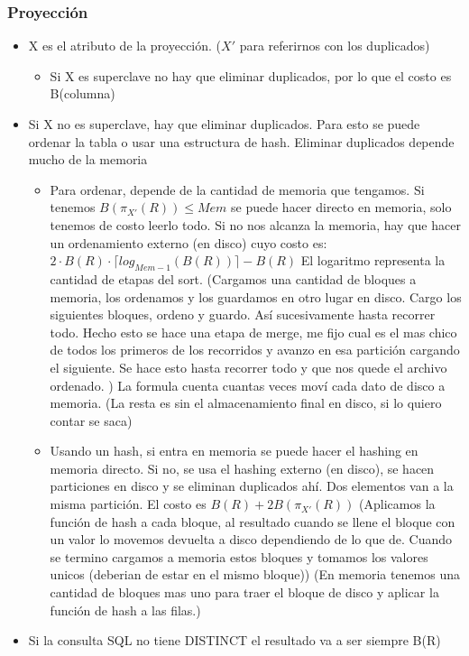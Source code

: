 \subsubsection*{Proyección}

\begin{itemize}
\item X es el atributo de la proyección. ($X'$ para referirnos con los duplicados)
    \begin{itemize}
    \item Si X es superclave no hay que eliminar duplicados, por lo que el costo es B(columna)
    \end{itemize}
\item Si X no es superclave, hay que eliminar duplicados. Para esto se puede ordenar la tabla o usar una estructura de hash. Eliminar duplicados depende mucho de la memoria
    \begin{itemize}
    \item Para ordenar, depende de la cantidad de memoria que tengamos. Si tenemos $B(\pi_{X'}(R)) \leq Mem$ se puede hacer directo en memoria, solo tenemos de costo leerlo todo. Si no nos alcanza la memoria, hay que hacer un ordenamiento externo (en disco) cuyo costo es: $ 2 \cdot B(R) \cdot \lceil log_{Mem-1}(B(R)) \rceil - B(R) $ El logaritmo representa la cantidad de etapas del sort. (Cargamos una cantidad de bloques a memoria, los ordenamos y los guardamos en otro lugar en disco. Cargo los siguientes bloques, ordeno y guardo. Así sucesivamente hasta recorrer todo. Hecho esto se hace una etapa de merge, me fijo cual es el mas chico de todos los primeros de los recorridos y avanzo en esa partición cargando el siguiente. Se hace esto hasta recorrer todo y que nos quede el archivo ordenado. ) La formula cuenta cuantas veces moví cada dato de disco a memoria. (La resta es sin el almacenamiento final en disco, si lo quiero contar se saca)
    \item Usando un hash, si entra en memoria se puede hacer el hashing en memoria directo. Si no, se usa el hashing externo (en disco), se hacen particiones en disco y se eliminan duplicados ahí. Dos elementos van a la misma partición. El costo es $B(R) + 2 B(\pi_{X'}(R))$ (Aplicamos la función de hash a cada bloque, al resultado cuando se llene el bloque con un valor lo movemos devuelta a disco dependiendo de lo que de. Cuando se termino cargamos a memoria estos bloques y tomamos los valores unicos (deberian de estar en el mismo bloque)) (En memoria tenemos una cantidad de bloques mas uno para traer el bloque de disco y aplicar la función de hash a las filas.)
    \end{itemize}
\item Si la consulta SQL no tiene DISTINCT el resultado va a ser siempre B(R)
\end{itemize}


